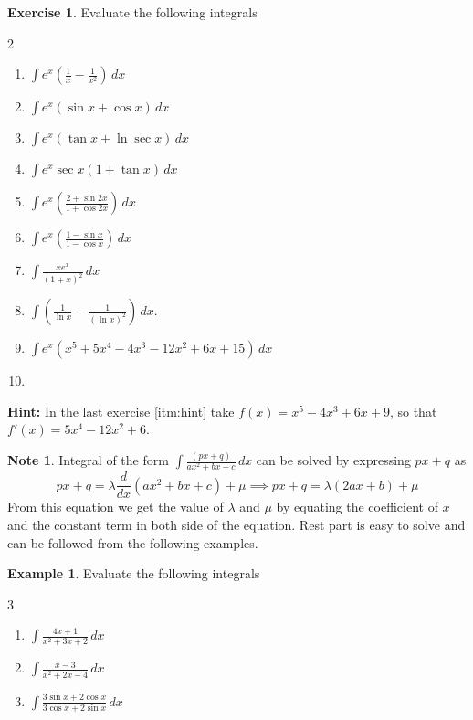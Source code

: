 \documentclass{book}
\theoremstyle{definition}
\newtheorem{exercise}{Exercise}[section]
\newtheorem{example}{Example}[section]
\newtheorem*{note}{Note}
\begin{document}
\begin{exercise}
Evaluate the following integrals
\begin{multicols}{2}
\begin{enumerate}[label=(\roman*)]
    \item $\displaystyle\int e^x(\frac{1}{x}-\frac{1}{x^2})\,dx$
    \item $\displaystyle\int e^x(\sin x+\cos x)\,dx$
    \item $\displaystyle\int e^x(\tan x+\ln \sec x)\,dx$
    \item $\displaystyle\int e^x\sec x(1+\tan x)\,dx$
    \item $\displaystyle\int e^x\left(\frac{2+\sin 2x}{1+\cos 2x}\right)\,dx$
    \item $\displaystyle\int e^x\left(\frac{1-\sin x}{1-\cos x}\right)\,dx$
    \item $\displaystyle\int \frac{xe^x}{(1+x)^2}\,dx$
    \item $\displaystyle\int (\frac{1}{\ln x}-\frac{1}{(\ln x)^2})\,dx$.
    \item \label{itm:hint} $\displaystyle\int e^x(x^5+5x^4-4x^3-12x^2+6x+15)\,dx$
    \item[] \phantom{x}

\end{enumerate}
\end{multicols}    
\end{exercise}

\textbf{Hint:} In the last exercise \ref{itm:hint} take $f(x)=x^5-4x^3+6x+9$, so that $f'(x)=5x^4-12x^2+6$.

\begin{note}
Integral of the form $\displaystyle\int\frac{(px+q)}{ax^2+bx+c} \,dx$ can be solved by expressing $px+q$ as 
\[
px+q=\lambda \frac{d}{dx}(ax^2+bx+c)+\mu \implies px+q=\lambda (2ax+b)+\mu
\]
From this equation we get the value of $\lambda$ and $\mu$ by equating the coefficient of $x$ and the constant term in both side of the equation. Rest part is easy to solve and can be followed from the following examples.
\end{note}

\newpage

\begin{example}
Evaluate the following integrals
\begin{multicols}{3}
\begin{enumerate}[label=(\roman*)]
    \item $\displaystyle\int \frac{4x+1}{x^2+3x+2}\,dx$
    \item $\displaystyle\int\frac{x-3}{x^2+2x-4}\,dx$
    \item $\displaystyle\int\frac{3\sin x+2\cos x}{3\cos x+2\sin x}\,dx$
\end{enumerate}
\end{multicols}    
\end{example}
\end{document}
